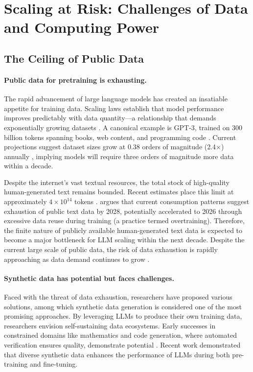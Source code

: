 \section{Scaling at Risk: Challenges of Data and Computing Power}
\subsection{The Ceiling of Public Data}
\label{subsec:data_exhaustion}
\paragraph{Public data for pretraining is exhausting.} The rapid advancement of large language models has created an insatiable appetite for training data. Scaling laws establish that model performance improves predictably with data quantity—a relationship that demands exponentially growing datasets \cite{hoffmann2022training}. A canonical example is GPT-3, trained on {300 billion tokens} spanning books, web content, and programming code \cite{brown2020language}. Current projections suggest dataset sizes grow at 0.38 orders of magnitude (2.4$\times$) annually \cite{villalobos2022trends}, implying models will require {three orders of magnitude more data} within a decade. 

Despite the internet's vast textual resources, the total stock of high-quality human-generated text remains bounded. Recent estimates place this limit at approximately {$4\times 10^{14}$ tokens} \cite{villalobos2022trends}. \cite{villalobos2024will} argues that current consumption patterns suggest exhaustion of public text data by 2028, potentially accelerated to 2026 through excessive data reuse during training (a practice termed {overtraining}). 
Therefore, the finite nature of publicly available human-generated text data is expected to become a major bottleneck for LLM scaling within the next decade. Despite the current large scale of public data, the risk of data exhaustion is rapidly approaching as data demand continues to grow \cite{sevilla2022compute}.

\paragraph{Synthetic data has potential but faces challenges.}
Faced with the threat of data exhaustion, researchers have proposed various solutions, among which synthetic data generation is considered one of the most promising approaches. 
By leveraging LLMs to produce their own training data, researchers envision {self-sustaining data ecosystems}. Early successes in constrained domains like mathematics and code generation, where automated verification ensures quality, demonstrate potential \cite{liu2023tinygsm}.  Recent work \cite{chen2024diversity} demonstrated that diverse synthetic data enhances the performance of LLMs during both pre-training and fine-tuning.


